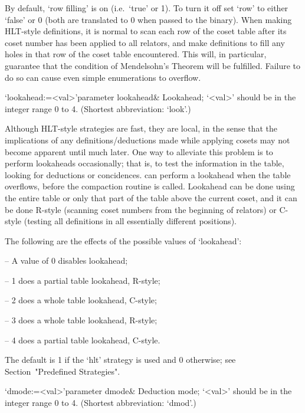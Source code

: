By default, \lq row filling' is on (i.e.~`true' or 1).  To turn it off
set `row' to either `false' or 0 (both are translated to 0 when passed
to  the {\ACE}  binary).   When making  HLT-style  definitions, it  is
normal to scan each row of  the coset table after its coset number has
been applied to  all relators, and make definitions  to fill any holes
in that row of the  coset table encountered. This will, in particular,
guarantee  that   the  condition  of  Mendelsohn's   Theorem  will  be
fulfilled.  Failure  to do  so can cause  even simple  enumerations to
overflow.

\>`lookahead:=<val>'{parameter lookahead}&
Lookahead; `<val>' should be in the integer range 0 to 4.
(Shortest abbreviation: `look'.)
  
Although HLT-style strategies  are fast, they are local,  in the sense
that  the  implications   of  any  definitions/deductions  made  while
applying cosets may not become  apparent until much later.  One way to
alleviate this problem is to perform lookaheads occasionally; that is,
to  test the  information  in  the table,  looking  for deductions  or
concidences.  {\ACE} can perform a lookahead when the table overflows,
before the compaction routine is  called.  Lookahead can be done using
the entire  table or  only that  part of the  table above  the current
coset, and  it can  be done R-style  (scanning coset numbers  from the
beginning  of relators)  or C-style  (testing all  definitions  in all
essentially different positions).

The following are the effects of the possible values of `lookahead':

\beginlist

\item{--} A value of 0 disables lookahead;
\item{--} 1 does a partial table lookahead, R-style; 
\item{--} 2 does a whole table lookahead, C-style; 
\item{--} 3 does a whole table lookahead, R-style; 
\item{--} 4 does a partial table lookahead, C-style.  

\endlist

The  default  is  1 if the `hlt' strategy is used and 0 otherwise;
see Section~"Predefined Strategies".


\>`dmode:=<val>'{parameter dmode}&
Deduction mode; `<val>' should be in the integer range 0 to 4.
(Shortest abbreviation: `dmod'.)

